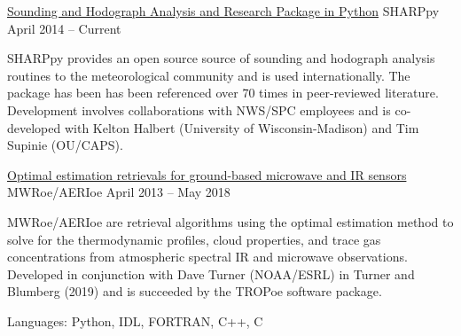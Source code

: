
\begin{cventries}
  \cventry
    {\href{https://github.com/sharppy/SHARPpy}{Sounding and Hodograph Analysis and Research Package in Python}} %
    {SHARPpy} %
    {} %
    {April 2014 -- Current} %
    {
      \begin{cvitems} %
        \item {SHARPpy provides an open source source of sounding and hodograph analysis routines to the meteorological community and is used internationally.  The package has been has been referenced over 70 times in peer-reviewed literature.  Development involves collaborations with NWS/SPC employees and is co-developed with Kelton Halbert (University of Wisconsin-Madison) and Tim Supinie (OU/CAPS).}
      \end{cvitems}
    }
  \cventry
    {\href{https://github.com/sharppy/SHARPpy}{Optimal estimation retrievals for ground-based microwave and IR sensors}} %
    {MWRoe/AERIoe} %
    {} %
    {April 2013 -- May 2018} %
    {
      \begin{cvitems} %
        \item {MWRoe/AERIoe are retrieval algorithms using the optimal estimation method to solve for the thermodynamic profiles, cloud properties, and trace gas concentrations from atmospheric spectral IR and microwave observations.  Developed in conjunction with Dave Turner (NOAA/ESRL) in Turner and Blumberg (2019) and is succeeded by the TROPoe software package.}
      \end{cvitems}
    }
    
   \cvskill
     {Languages:}
     {Python, IDL, FORTRAN, C++, C}
     
\end{cventries}